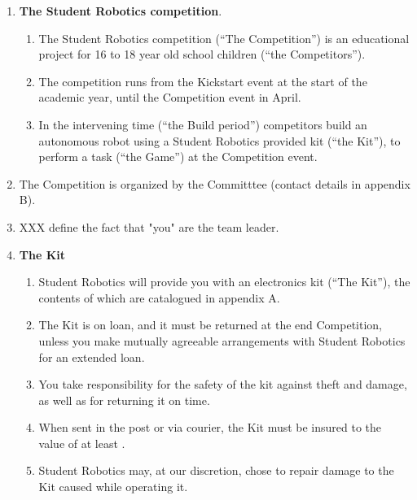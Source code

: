 \documentclass[a4paper, 11pt]{scrartcl}
\begin{document}
\begin{enumerate}

\item \textbf{The Student Robotics competition}.
\begin{enumerate}

\item The Student Robotics competition (``The Competition'') is an educational
project for 16 to 18 year old school children (``the Competitors'').

\item The competition runs from the Kickstart event at the start of the academic
year, until the Competition event in April.

\item In the intervening time (``the Build period'') competitors build an
autonomous robot using a Student Robotics provided kit (``the Kit''), to perform
a task (``the Game'') at the Competition event.
\end{enumerate}

\item The Competition is organized by the Committtee (contact
details in appendix B).

\item XXX define the fact that "you" are the team leader.

\item \textbf{The Kit}\\
\begin{enumerate}

\item Student Robotics will provide you with an electronics kit (``The Kit''),
the contents of which are catalogued in appendix A.

\item The Kit is on loan, and it must be returned at the end Competition,
unless you make mutually agreeable arrangements with Student Robotics for an
extended loan.

\item You take responsibility for the safety of the kit against theft and
damage, as well as for returning it on time.

\item When sent in the post or via courier, the Kit must be insured to the value
of at least .

\item Student Robotics may, at our discretion, chose to repair damage to the
Kit caused while operating it.


\end{enumerate}
\end{enumerate}
\end{document}
